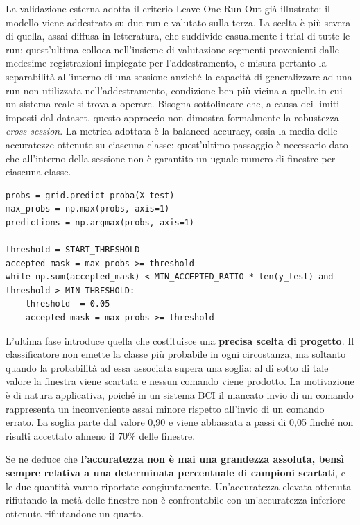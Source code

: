 La validazione esterna adotta il criterio Leave-One-Run-Out già illustrato: il modello viene addestrato su due run e valutato sulla terza. La scelta è più severa di quella, assai diffusa in letteratura, che suddivide casualmente i trial di tutte le run: quest’ultima colloca nell’insieme di valutazione segmenti provenienti dalle medesime registrazioni impiegate per l’addestramento, e misura pertanto la separabilità all’interno di una sessione anziché la capacità di generalizzare ad una run non utilizzata nell'addestramento, condizione ben più vicina a quella in cui un sistema reale si trova a operare. Bisogna sottolineare che, a causa dei limiti imposti dal dataset, questo approccio non dimostra formalmente la robustezza \emph{cross-session}. La metrica adottata è la balanced accuracy, ossia la media delle accuratezze ottenute su ciascuna classe: quest'ultimo passaggio è necessario dato che all'interno della sessione non è garantito un uguale numero di finestre per ciascuna classe.

\begin{lstlisting}
probs = grid.predict_proba(X_test)
max_probs = np.max(probs, axis=1)
predictions = np.argmax(probs, axis=1)

threshold = START_THRESHOLD
accepted_mask = max_probs >= threshold
while np.sum(accepted_mask) < MIN_ACCEPTED_RATIO * len(y_test) and threshold > MIN_THRESHOLD:
    threshold -= 0.05
    accepted_mask = max_probs >= threshold
\end{lstlisting}

L’ultima fase introduce quella che costituisce una \textbf{precisa scelta di progetto}. Il classificatore non emette la classe più probabile in ogni circostanza, ma soltanto quando la probabilità ad essa associata supera una soglia: al di sotto di tale valore la finestra viene scartata e nessun comando viene prodotto. La motivazione è di natura applicativa, poiché in un sistema BCI il mancato invio di un comando rappresenta un inconveniente assai minore rispetto all’invio di un comando errato. La soglia parte dal valore 0,90 e viene abbassata a passi di 0,05 finché non risulti accettato almeno il 70\% delle finestre.

Se ne deduce che \textbf{l’accuratezza non è mai una grandezza assoluta, bensì sempre relativa a una determinata percentuale di campioni scartati}, e le due quantità vanno riportate congiuntamente. Un’accuratezza elevata ottenuta rifiutando la metà delle finestre non è confrontabile con un’accuratezza inferiore ottenuta rifiutandone un quarto.

